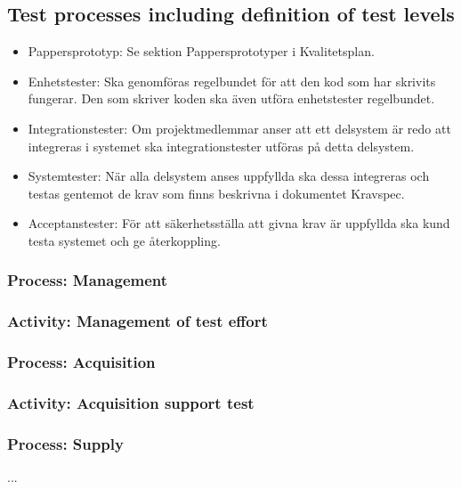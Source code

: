 \documentclass[a4paper,10pt]{article}
\begin{document}
\subsection{Test processes including definition of test levels}
\begin{itemize}
	\item Pappersprototyp: Se sektion Pappersprototyper i Kvalitetsplan.
	\item Enhetstester: Ska genomföras regelbundet för att den kod som har skrivits fungerar. Den som skriver koden ska även utföra enhetstester regelbundet.
	\item Integrationstester: Om projektmedlemmar anser att ett delsystem är redo att integreras i systemet ska integrationstester utföras på detta delsystem.
	\item Systemtester: När alla delsystem anses uppfyllda ska dessa integreras och testas gentemot de krav som finns beskrivna i dokumentet Kravspec.
	\item Acceptanstester: För att säkerhetsställa att givna krav är uppfyllda ska kund testa systemet och ge återkoppling.
\end{itemize}

\subsubsection{Process: Management}
\subsubsection{Activity: Management of test effort}
\subsubsection{Process: Acquisition}
\subsubsection{Activity: Acquisition support test}
\subsubsection{Process: Supply}

...
\end{document}
